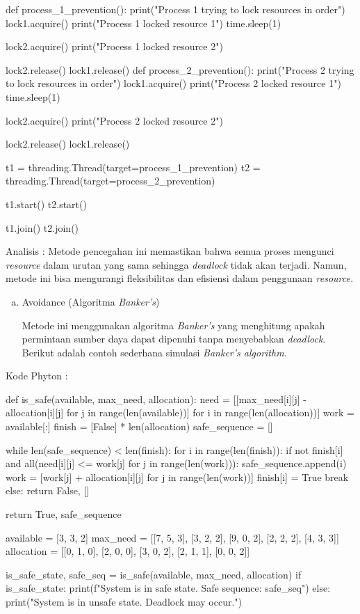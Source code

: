 \documentclass[12pt]{article}
\begin{document}
\begin{python}
def process_1_prevention():
    print("Process 1 trying to lock resources in order")
    lock1.acquire()
    print("Process 1 locked resource 1")
    time.sleep(1)
    
    lock2.acquire()
    print("Process 1 locked resource 2")
    
    lock2.release()
    lock1.release()
def process_2_prevention():
    print("Process 2 trying to lock resources in order")
    lock1.acquire()
    print("Process 2 locked resource 1")
    time.sleep(1)
    
    lock2.acquire()
    print("Process 2 locked resource 2")
    
    lock2.release()
    lock1.release()

t1 = threading.Thread(target=process_1_prevention)
t2 = threading.Thread(target=process_2_prevention)

t1.start()
t2.start()

t1.join()
t2.join()
\end{python}


Analisis : Metode pencegahan ini memastikan bahwa semua proses mengunci \textit{resource} dalam urutan yang sama sehingga \textit{deadlock} tidak akan terjadi. Namun, metode ini bisa mengurangi fleksibilitas dan efisiensi dalam penggunaan \textit{resource.}

\begin{enumerate}[c.]
    \item {Avoidance} (Algoritma \textit{Banker's})

    Metode ini menggunakan algoritma \textit{Banker's} yang menghitung apakah permintaan sumber daya dapat dipenuhi tanpa menyebabkan \textit{deadlock}. Berikut adalah contoh sederhana simulasi \textit{Banker's algorithm.}
\end{enumerate}

Kode Phyton :

\begin{python}
def is_safe(available, max_need, allocation):
    need = [[max_need[i][j] - allocation[i][j] for j in range(len(available))] for i in range(len(allocation))]
    work = available[:]
    finish = [False] * len(allocation)
    safe_sequence = []

    while len(safe_sequence) < len(finish):
        for i in range(len(finish)):
            if not finish[i] and all(need[i][j] <= work[j] for j in range(len(work))):
                safe_sequence.append(i)
                work = [work[j] + allocation[i][j] for j in range(len(work))]
                finish[i] = True
                break
        else:
            return False, []

    return True, safe_sequence

available = [3, 3, 2]
max_need = [[7, 5, 3], [3, 2, 2], [9, 0, 2], [2, 2, 2], [4, 3, 3]]
allocation = [[0, 1, 0], [2, 0, 0], [3, 0, 2], [2, 1, 1], [0, 0, 2]]

is_safe_state, safe_seq = is_safe(available, max_need, allocation)
if is_safe_state:
    print(f"System is in safe state. Safe sequence: {safe_seq}")
else:
    print("System is in unsafe state. Deadlock may occur.")
\end{python}
\end{document}
